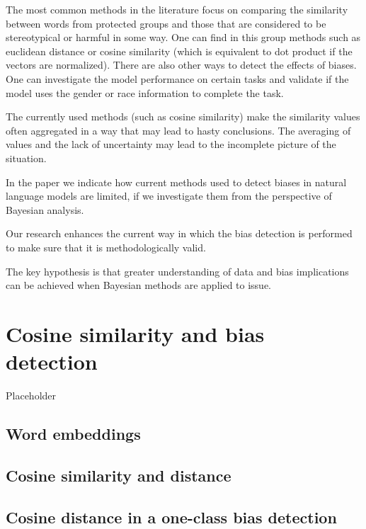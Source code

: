 \documentclass[
  12pt,
]{book}
\begin{document}
The most common methods in the literature focus on comparing the similarity between words from protected groups and those that are considered to be stereotypical or harmful in some way. One can find in this group methods such as euclidean distance or cosine similarity (which is equivalent to dot product if the
vectors are normalized). There are also other ways to detect the effects of biases. One can investigate the model performance on certain tasks and validate if the model uses the gender or race information to complete the task.

The currently used methods (such as cosine similarity) make the similarity values often aggregated in a way that may lead to hasty conclusions. The averaging of values and the lack of uncertainty may lead to the incomplete picture of the situation.

In the paper we indicate how current methods used to detect biases in natural language models are limited, if we investigate them from the perspective of Bayesian analysis.

Our research enhances the current way in which the bias detection is performed to make sure that it is
methodologically valid.

The key hypothesis is that greater understanding of data and bias implications can be achieved when Bayesian methods are applied to issue.

\hypertarget{cosine-similarity-and-bias-detection}{%
\chapter{Cosine similarity and bias detection}\label{cosine-similarity-and-bias-detection}}

Placeholder

\hypertarget{word-embeddings}{%
\section{Word embeddings}\label{word-embeddings}}

\hypertarget{cosine-similarity-and-distance}{%
\section{Cosine similarity and distance}\label{cosine-similarity-and-distance}}

\hypertarget{cosine-distance-in-a-one-class-bias-detection}{%
\section{Cosine distance in a one-class bias detection}\label{cosine-distance-in-a-one-class-bias-detection}}
\end{document}
